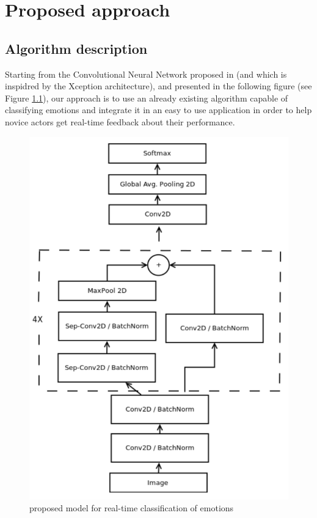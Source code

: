 \documentclass[runningheads,a4paper,11pt]{report}
\begin{document}
\chapter{Proposed approach}
\label{chapter:proposedApproach}

\section{Algorithm description}
\label{section:ad}

Starting from the Convolutional Neural Network proposed in \cite{Arriaga17} (and which is inspidred by the Xception \cite{Chollet16} architecture), and presented in the following figure (see Figure \ref{cnnModel}), our approach is to use an already existing algorithm capable of classifying emotions and integrate it in an easy to use application in order to help novice actors get real-time feedback about their performance.

\begin{figure}[htbp]
\begin{center}
	\includegraphics[scale=0.37]{Fig/cnnModel.pdf}
	\caption{\cite{Arriaga17} proposed model for real-time classification of emotions}
	\label{cnnModel}
\end{center}
\end{figure}
\end{document}
